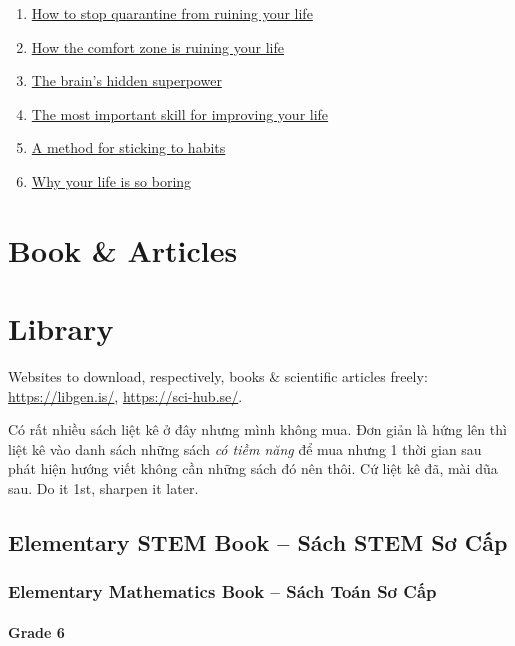 \documentclass{article}
\begin{document}
\begin{enumerate}
	\item \href{https://www.youtube.com/watch?v=b8SRAKfP2J4}{How to stop quarantine from ruining your life}
	\item \href{https://www.youtube.com/watch?v=0h-IAlNjd4Q}{How the comfort zone is ruining your life}
	\item \href{https://www.youtube.com/watch?v=CkJGBM3rLLM}{The brain's hidden superpower}
	\item \href{https://www.youtube.com/watch?v=SIsCy663mz4}{The most important skill for improving your life}
	\item \href{https://www.youtube.com/watch?v=GtNEf9UyOLg}{A method for sticking to habits}
	\item \href{https://www.youtube.com/watch?v=-dYgnvrvQ3M}{Why your life is so boring}
\end{enumerate}


\section{Book \& Articles}


\section*{Library}
{\sf Websites to download, respectively, books \& scientific articles freely:} \url{https://libgen.is/}, \url{https://sci-hub.se/}.

Có rất nhiều sách liệt kê ở đây nhưng mình không mua. Đơn giản là hứng lên  thì liệt kê vào danh sách những sách \emph{có tiềm năng} để mua nhưng 1 thời gian sau phát hiện hướng viết không cần những sách đó nên thôi. Cứ liệt kê đã, mài dũa sau. Do it 1st, sharpen it later.

\subsection{Elementary STEM Book -- Sách STEM Sơ Cấp}

\subsubsection{Elementary Mathematics Book -- Sách Toán Sơ Cấp}

\paragraph{Grade 6}
\end{document}
